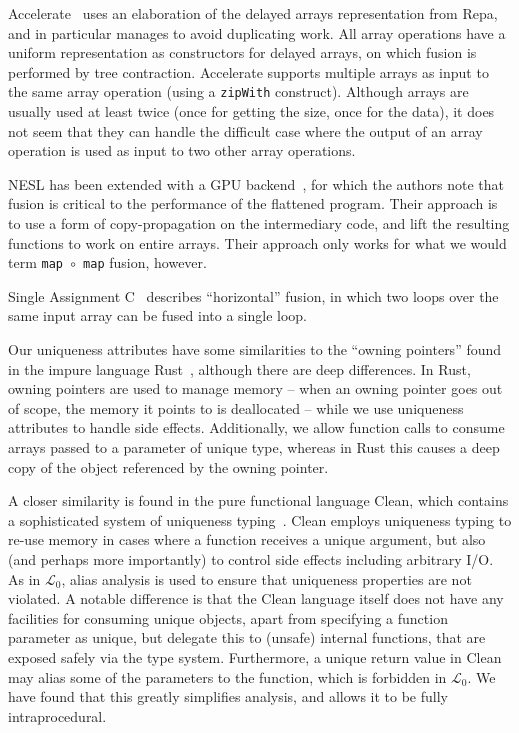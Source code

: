 \documentclass{sigplanconf}  %
\newcommand{\LO}{$\mathcal{L}_0$}
\begin{document}
Accelerate~\cite{mcdonell2013optimising} uses an elaboration of the
delayed arrays representation from Repa, and in particular manages to
avoid duplicating work.  All array operations have a uniform
representation as constructors for delayed arrays, on which fusion is
performed by tree contraction.  Accelerate supports multiple arrays as
input to the same array operation (using a {\tt zipWith} construct).
Although arrays are usually used at least twice (once for getting the
size, once for the data), it does not seem that they can handle the difficult
case where the output of an array operation is used as input to two
other array operations.

NESL has been extended with a GPU backend~\cite{bergstrom2012nested},
for which the authors note that fusion is critical to the performance
of the flattened program.  Their approach is to use a form of
copy-propagation on the intermediary code, and lift the resulting
functions to work on entire arrays.  Their approach only works for
what we would term {\tt map $\circ$ map} fusion, however.

Single Assignment C~\cite{grelck2006sac} describes ``horizontal''
fusion, in which two loops over the same input array can be fused into
a single loop.

Our uniqueness attributes have some similarities to the ``owning
pointers'' found in the impure language Rust~\cite{rust}, although
there are deep differences.  In Rust, owning pointers are used to
manage memory -- when an owning pointer goes out of scope, the memory
it points to is deallocated -- while we use uniqueness attributes to
handle side effects.  Additionally, we allow function calls to consume
arrays passed to a parameter of unique type, whereas in Rust this
causes a deep copy of the object referenced by the owning pointer.

A closer similarity is found in the pure functional language Clean,
which contains a sophisticated system of uniqueness
typing~\cite{barendsen1996uniqueness}.  Clean employs uniqueness
typing to re-use memory in cases where a function receives a unique
argument, but also (and perhaps more importantly) to control side
effects including arbitrary I/O.  As in \LO{}, alias analysis is used
to ensure that uniqueness properties are not violated.  A notable
difference is that the Clean language itself does not have any
facilities for consuming unique objects, apart from specifying a
function parameter as unique, but delegate this to (unsafe) internal
functions, that are exposed safely via the type system.  Furthermore,
a unique return value in Clean may alias some of the parameters to the
function, which is forbidden in \LO{}.  We have found that this
greatly simplifies analysis, and allows it to be fully
intraprocedural.
\end{document}
